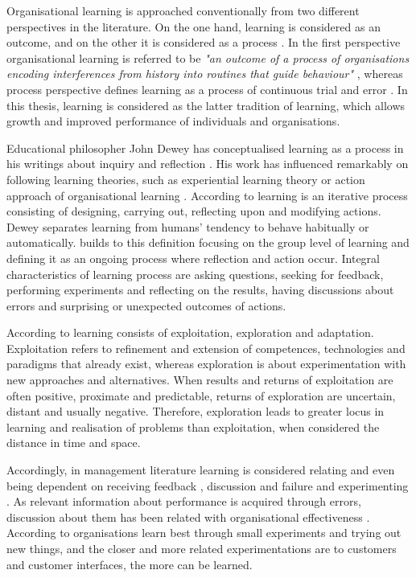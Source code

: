Organisational learning is approached conventionally from two different perspectives in the literature. On the one hand, learning is considered as an outcome, and on the other it is considered as a process \citep{edmondson1999psychological}. In the first perspective organisational learning is referred to be \textit{"an outcome of a process of organisations encoding interferences from history into routines that guide behaviour"} \citep{levitt1988organizational}, whereas process perspective defines learning as a process of continuous trial and error \citep{argyris1978organizational}. In this thesis, learning is considered as the latter tradition of learning, which allows growth and improved performance of individuals and organisations.

Educational philosopher John Dewey has conceptualised learning as a process in his writings about inquiry and reflection \citep{dewey1956human}. His work has influenced remarkably on following learning theories, such as experiential learning theory \citep{kolb1984experiential} or action approach of organisational learning \citep{schon1983reflective}. According to \citet{dewey1956human} learning is an iterative process consisting of designing, carrying out, reflecting upon and modifying actions. Dewey separates learning from humans' tendency to behave habitually or automatically. \citet{edmondson1999psychological} builds to this definition focusing on the group level of learning and defining it as an ongoing process where reflection and action occur. Integral characteristics of learning process are asking questions, seeking for feedback, performing experiments and reflecting on the results, having discussions about errors and surprising or unexpected outcomes of actions.

According to \citet{march1991exploration} learning consists of exploitation, exploration and adaptation. Exploitation refers to refinement and extension of competences, technologies and paradigms that already exist, whereas exploration is about experimentation with new approaches and alternatives. When results and returns of exploitation are often positive, proximate and predictable, returns of exploration are uncertain, distant and usually negative. Therefore, exploration leads to greater locus in learning and realisation of problems than exploitation, when considered the distance in time and space. \citep{march1991exploration}

Accordingly, in management literature learning is considered relating and even being dependent on receiving feedback \citep{schon1983reflective}, discussion and failure \citep{sitkin1992learning} and experimenting \citep{henderson1990architectural}. As relevant information about performance is acquired through errors, discussion about them has been related with organisational effectiveness \citep{sitkin1992learning}. According to \citet{huy2003rhythm} organisations learn best through small experiments and trying out new things, and the closer and more related experimentations are to customers and customer interfaces, the more can be learned. 


